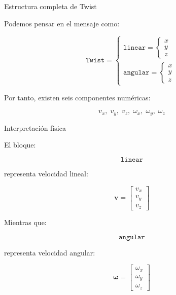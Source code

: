 \documentclass[aspectratio=169]{beamer}
\begin{document}
\begin{frame}{Estructura completa de Twist}

    Podemos pensar en el mensaje como:

    \[
    \texttt{Twist}
    =
    \left\{
    \begin{array}{l}
        \texttt{linear}=
        \left\{
        \begin{array}{l}
            x\\
            y\\
            z
        \end{array}
        \right.
        \\[4mm]
        \texttt{angular}=
        \left\{
        \begin{array}{l}
            x\\
            y\\
            z
        \end{array}
        \right.
    \end{array}
    \right.
    \]

    \vspace{0.3cm}

    Por tanto, existen seis componentes numéricas:

    \[
    v_x,\;v_y,\;v_z,\;
    \omega_x,\;\omega_y,\;\omega_z
    \]

\end{frame}

\begin{frame}{Interpretación física}

    El bloque:

    \[
    \texttt{linear}
    \]

    representa velocidad lineal:

    \[
    \mathbf{v}
    =
    \begin{bmatrix}
        v_x\\
        v_y\\
        v_z
    \end{bmatrix}
    \]

    Mientras que:

    \[
    \texttt{angular}
    \]

    representa velocidad angular:

    \[
    \boldsymbol{\omega}
    =
    \begin{bmatrix}
        \omega_x\\
        \omega_y\\
        \omega_z
    \end{bmatrix}
    \]

\end{frame}
\end{document}

